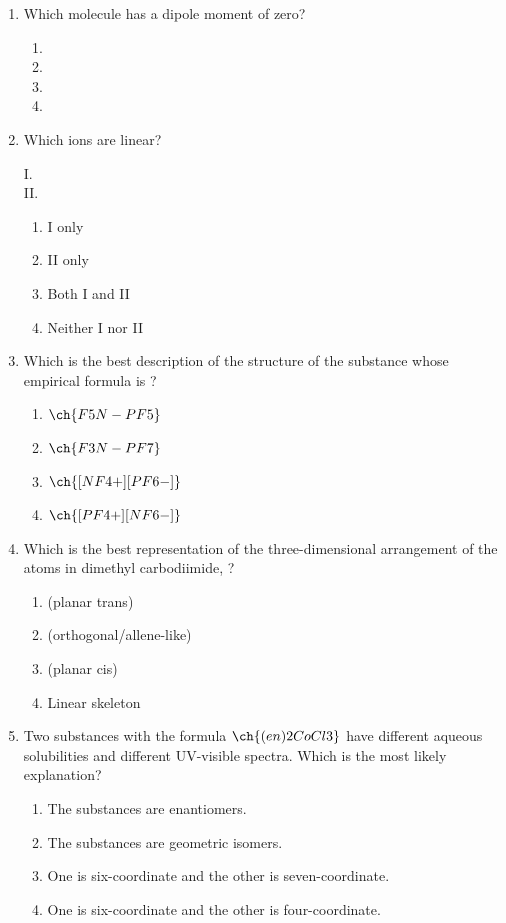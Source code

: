 \documentclass[twocolumn,10pt]{article}
\begin{document}
\begin{enumerate}[label=\arabic*., leftmargin=*]
\item Which molecule has a dipole moment of zero?
\begin{enumerate}[label=(\Alph*)]
    \item {} \item {} \item {} \item {}
\end{enumerate}

\item Which ions are linear?
\begin{description}
    \item[I.] 
    \item[II.] 
\end{description}
\begin{enumerate}[label=(\Alph*)]
    \item I only \item II only \item Both I and II \item Neither I nor II
\end{enumerate}

\item Which is the best description of the structure of the substance whose empirical formula is ?
\begin{enumerate}[label=(\Alph*)]
    \item $\ch{F5N-PF5}$ \item $\ch{F3N-PF7}$ \item $\ch{[NF4+][PF6-]}$ \item $\ch{[PF4+][NF6-]}$
\end{enumerate}

\item Which is the best representation of the three-dimensional arrangement of the atoms in dimethyl carbodiimide, ?
\begin{enumerate}[label=(\Alph*)]
    \item {} (planar trans)
    \item {} (orthogonal/allene-like)
    \item {} (planar cis)
    \item Linear skeleton
\end{enumerate}

\item Two substances with the formula $\ch{(en)2CoCl3}$ have different aqueous solubilities and different UV-visible spectra. Which is the most likely explanation?
\begin{enumerate}[label=(\Alph*)]
    \item The substances are enantiomers.
    \item The substances are geometric isomers.
    \item One is six-coordinate and the other is seven-coordinate.
    \item One is six-coordinate and the other is four-coordinate.
\end{enumerate}


\end{enumerate}
\end{document}
